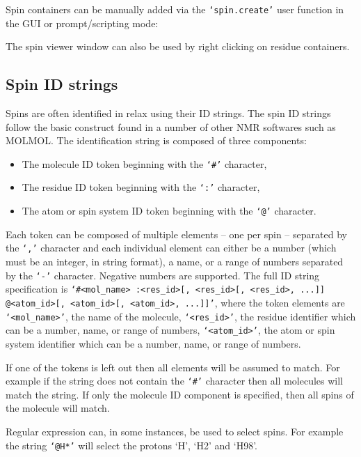 Spin containers can be manually added via the \texttt{`spin.create'} user function in the GUI or prompt/scripting mode:


The spin viewer window can also be used by right clicking on residue containers.




\subsection{Spin ID strings}

Spins are often identified in relax using their ID strings.  The spin ID strings follow the basic construct found in a number of other NMR softwares such as MOLMOL.  The identification string is composed of three components:

\begin{itemize}
\item The molecule ID token beginning with the \texttt{`\#'} character,
\item The residue ID token beginning with the \texttt{`:'} character,
\item The atom or spin system ID token beginning with the \texttt{`@'} character.
\end{itemize}

Each token can be composed of multiple elements -- one per spin -- separated by the \texttt{`,'} character and each individual element can either be a number (which must be an integer, in string format), a name, or a range of numbers separated by the \texttt{`-'} character.  Negative numbers are supported.  The full ID string specification is \texttt{`\#<mol\_name> :<res\_id>[, <res\_id>[, <res\_id>, ...]] @<atom\_id>[, <atom\_id>[, <atom\_id>, ...]]'}, where the token elements are \texttt{`<mol\_name>'}, the name of the molecule, \texttt{`<res\_id>'}, the residue identifier which can be a number, name, or range of numbers, \texttt{`<atom\_id>'}, the atom or spin system identifier which can be a number, name, or range of numbers.

If one of the tokens is left out then all elements will be assumed to match.  For example if the string does not contain the \texttt{`\#'} character then all molecules will match the string.  If only the molecule ID component is specified, then all spins of the molecule will match.

Regular expression can, in some instances, be used to select spins.  For example the string \texttt{`@H*'} will select the protons `H', `H2' and `H98'.



